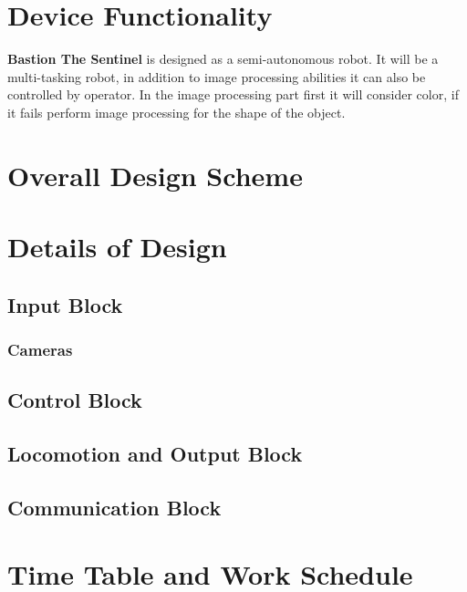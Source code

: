 \documentclass[12pt,a4paper]{article}
\begin{document}
\section{Device Functionality}
 \begin{flushleft}
  \textbf{Bastion The Sentinel} is designed as a semi-autonomous robot. It will be a multi-tasking robot, in addition to 
  image processing abilities it can also be controlled by operator.
  In the image processing part first it will 
  consider color, if it fails perform image processing for the shape of the object.
 \end{flushleft}
 
 \section{Overall Design Scheme}
 \begin{flushleft}
  
 \end{flushleft}
 
 \section{Details of Design}
  \begin{flushleft}
   \subsection{Input Block}
    \subsubsection{Cameras}
     \begin{flushleft}
      
     \end{flushleft}
   \subsection{Control Block}
   \subsection{Locomotion and Output Block}
   \subsection{Communication Block}
  
 \end{flushleft}
 
 \section{Time Table and Work Schedule}
  \begin{flushleft}
   
  \end{flushleft}
  
\end{document}
